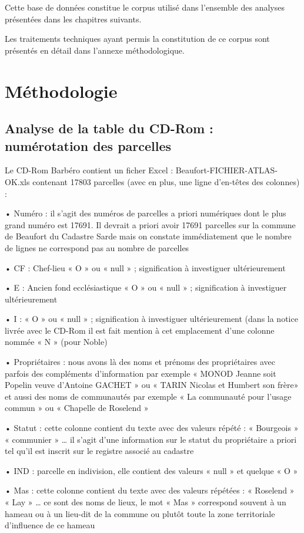 \documentclass[12pt,a4paper]{report}
\begin{document}
Cette base de données constitue le corpus utilisé dans l'ensemble des analyses présentées dans les chapitres suivants.

Les traitements techniques ayant permis la constitution de ce corpus sont présentés en détail dans l'annexe méthodologique.

\section{Méthodologie}

\subsection{Analyse de la table du CD-Rom : numérotation des parcelles}

Le CD-Rom Barbéro contient un ficher Excel : Beaufort-FICHIER-ATLAS-OK.xls contenant 17803 parcelles  (avec en plus, une ligne d’en-têtes des colonnes) :

•	Numéro : il s’agit des numéros de parcelles a priori numériques dont le plus grand numéro est 17691. Il devrait a priori avoir 17691 parcelles sur la commune de Beaufort du Cadastre Sarde mais on constate immédiatement que le nombre de lignes ne correspond pas au nombre de parcelles

•	CF : Chef-lieu « O » ou « null » ; signification à investiguer ultérieurement

•	E : Ancien fond ecclésiastique « O » ou « null » ; signification à investiguer ultérieurement

•	I : « O » ou « null » ; signification à investiguer ultérieurement (dans la notice livrée avec le CD-Rom il est fait mention à cet emplacement d’une colonne nommée « N » (pour Noble)

•	Propriétaires : nous avons là des noms et prénoms des propriétaires avec parfois des compléments d’information par exemple « MONOD Jeanne soit Popelin veuve d'Antoine GACHET » ou « TARIN Nicolas et Humbert son frère» et aussi des noms de communautés par exemple « La communauté pour l'usage commun » ou « Chapelle de Roselend »

•	Statut : cette colonne contient du texte avec des valeurs répété : « Bourgeois » « communier » … il s’agit d’une information sur le statut du propriétaire a priori tel qu’il est inscrit sur le registre associé au cadastre

•	IND : parcelle en indivision, elle contient des valeurs « null » et quelque « O »

•	Mas : cette colonne contient du texte avec des valeurs répétées : « Roselend » « Lay » … ce sont des noms de lieux, le mot « Mas » correspond souvent à un hameau ou à un lieu-dit de la commune ou plutôt toute la zone territoriale d’influence de ce hameau
\end{document}
